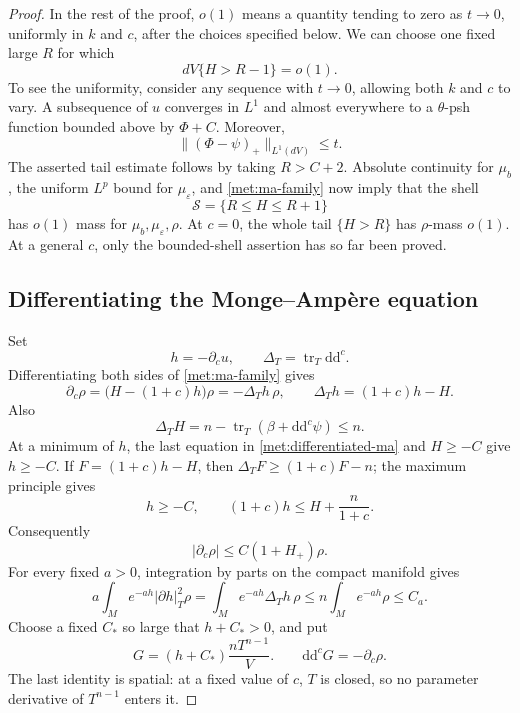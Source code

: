 \documentclass[11pt,letterpaper]{article}
\theoremstyle{definition}
\theoremstyle{remark}
\begin{document}
\begin{proof}
In the rest of the proof, \(o(1)\) means a quantity tending to zero
as \(t\to0\), uniformly in \(k\) and \(c\), after the choices specified
below.  We can choose one fixed large \(R\) for which
\begin{equation}
 \label{met:small-volume-tail}
 dV\{H>R-1\}=o(1).
\end{equation}
To see the uniformity, consider any sequence with \(t\to0\), allowing
both \(k\) and \(c\) to vary.  A subsequence of \(u\) converges in
\(L^1\) and almost everywhere to a \(\theta\)-psh function bounded
above by \(\Phi+C\).  Moreover,
\[
 \| (\Phi-\psi)_+\|_{L^1(dV)}\leq t.
\]
The asserted tail estimate follows by taking \(R>C+2\).
Absolute continuity for \(\mu_b\), the uniform \(L^p\) bound for
\(\mu_\varepsilon\), and \eqref{met:ma-family} now imply that the
shell
\begin{equation}
 \label{met:shell}
 \mathcal S=\{R\leq H\leq R+1\}
\end{equation}
has \(o(1)\) mass for \(\mu_b,\mu_\varepsilon,\rho\).
At \(c=0\), the whole tail \(\{H>R\}\) has \(\rho\)-mass \(o(1)\).
At a general \(c\), only the bounded-shell assertion has so far
been proved.

\subsection*{Differentiating the Monge--Amp\`ere equation}

Set
\[
 h=-\partial_cu,
 \qquad \Delta_T=\operatorname{tr}_T\mathrm{d}\mathrm{d}^{c}.
\]
Differentiating both sides of \eqref{met:ma-family} gives
\begin{equation}
 \label{met:differentiated-ma}
 \partial_c\rho
   =\bigl(H-(1+c)h\bigr)\rho
   =-\Delta_T h\,\rho,
 \qquad
 \Delta_T h=(1+c)h-H.
\end{equation}
Also
\[
 \Delta_T H
   =n-\operatorname{tr}_T(\beta+\mathrm{d}\mathrm{d}^{c}\psi)\leq n.
\]
At a minimum of \(h\), the last equation in
\eqref{met:differentiated-ma} and \(H\geq-C\) give \(h\geq-C\).
If \(F=(1+c)h-H\), then
\(\Delta_TF\geq(1+c)F-n\); the maximum principle gives
\begin{equation}
 \label{met:h-bounds}
 h\geq-C,
 \qquad
 (1+c)h\leq H+\frac{n}{1+c}.
\end{equation}
Consequently
\begin{equation}
 \label{met:parameter-variation}
 |\partial_c\rho|\leq C(1+H_+)\rho.
\end{equation}
For every fixed \(a>0\), integration by parts on the compact manifold
gives
\begin{equation}
 \label{met:h-energy}
 a\int_M e^{-ah}|\partial h|_T^2\rho
 =\int_M e^{-ah}\Delta_T h\,\rho
 \leq n\int_Me^{-ah}\rho
 \leq C_a.
\end{equation}
Choose a fixed \(C_*\) so large that \(h+C_*>0\), and put
\begin{equation}
 \label{met:transport-form}
 G=(h+C_*)\frac{nT^{n-1}}V.
 \qquad
 \mathrm{d}\mathrm{d}^{c} G=-\partial_c\rho.
\end{equation}
The last identity is spatial: at a fixed value of \(c\), \(T\) is
closed, so no parameter derivative of \(T^{n-1}\) enters it.


\end{proof}
\end{document}
